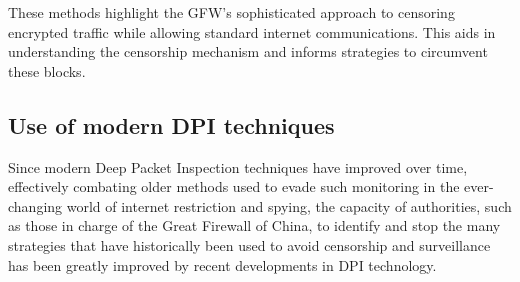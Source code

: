 \documentclass[12pt, fleqn, a4paper]{article}
\begin{document}
These methods highlight the GFW's sophisticated approach to censoring encrypted traffic while allowing standard internet communications. This aids in understanding the censorship mechanism and informs strategies to circumvent these blocks.

\subsection{Use of modern DPI techniques}
Since modern Deep Packet Inspection techniques have improved over time, effectively combating older methods used to evade such monitoring in the ever-changing world of internet restriction and spying, the capacity of authorities, such as those in charge of the Great Firewall of China, to identify and stop the many strategies that have historically been used to avoid censorship and surveillance has been greatly improved by recent developments in DPI technology.
\end{document}
